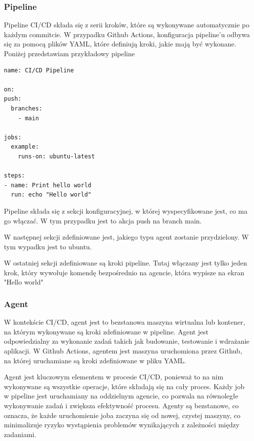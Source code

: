 \documentclass{article}
\begin{document}
\subsubsection{Pipeline}

Pipeline CI/CD składa się z serii kroków, które są wykonywane automatycznie po każdym commitcie. W przypadku Github Actions, konfiguracja pipeline'u odbywa się za pomocą plików YAML, które definiują kroki, jakie mają być wykonane. Poniżej przedstawiam przykładowy pipeline

\begin{lstlisting}[caption=Przykładowa konfiguracja pipeline'u w Github Actions]
name: CI/CD Pipeline

on:
push:
  branches:
    - main

jobs:
  example:
    runs-on: ubuntu-latest

steps:
- name: Print hello world
  run: echo "Hello world"

\end{lstlisting}

Pipeline składa się z sekcji konfiguracyjnej, w której wyspecyfikowane jest, co ma go włączać. W tym przypadku jest to akcja push na branch main.

W następnej sekcji zdefiniowane jest, jakiego typu agent zostanie przydzielony. W tym wypadku jest to ubuntu.

W ostatniej sekcji zdefiniowane są kroki pipeline. Tutaj włączany jest tylko jeden krok, który wywołuje komendę bezpośrednio na agencie, która wypisze na ekran "Hello world"

\subsubsection{Agent}

W kontekście CI/CD, agent jest to bezstanowa maszyna wirtualna lub kontener, na którym wykonywane są kroki zdefiniowane w pipeline. Agent jest odpowiedzialny za wykonanie zadań takich jak budowanie, testowanie i wdrażanie aplikacji. W Github Actions, agentem jest maszyna uruchomiona przez Github, na której uruchamiane są kroki zdefiniowane w pliku YAML.

Agent jest kluczowym elementem w procesie CI/CD, ponieważ to na nim wykonywane są wszystkie operacje, które składają się na cały proces. Każdy job w pipeline jest uruchamiany na oddzielnym agencie, co pozwala na równoległe wykonywanie zadań i zwiększa efektywność procesu. Agenty są bezstanowe, co oznacza, że każde uruchomienie joba zaczyna się od nowej, czystej maszyny, co minimalizuje ryzyko wystąpienia problemów wynikających z zależności między zadaniami.
\end{document}

